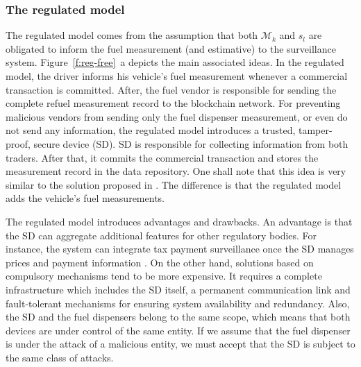 \documentclass[sigplan]{acmart}
\begin{document}
\subsubsection{The regulated model}
The regulated model comes from the assumption that both $\mathcal{M}_k$ and $s_l$ are obligated to inform the fuel measurement (and estimative) to the surveillance system.
Figure~\ref{f:reg-free}~a depicts the main associated ideas.
In the regulated model, the driver informs his vehicle's fuel measurement whenever a commercial transaction is committed.
After, the fuel vendor is responsible for sending the complete refuel measurement record to the blockchain network.
For preventing malicious vendors from sending only the fuel dispenser measurement, or even do not send any information, the regulated model introduces a trusted, tamper-proof, secure device (SD).
SD is responsible for collecting information from both traders.
After that, it commits the commercial transaction and stores the measurement record in the data repository.
One shall note that this idea is very similar to the solution proposed in \cite{Beteto2016}. 
The difference is that the regulated model adds the vehicle's fuel measurements.

The regulated model introduces advantages and drawbacks.
An advantage is that the SD can aggregate additional features for other regulatory bodies. 
For instance, the system can integrate tax payment surveillance once the SD manages prices and payment information \cite{Beteto2016}. 
On the other hand, solutions based on compulsory mechanisms tend to be more expensive.
It requires a complete infrastructure which includes the SD itself, a permanent communication link and fault-tolerant mechanisms for ensuring system availability and redundancy.
Also, the SD and the fuel dispensers belong to the same scope, which means that both devices are under control of the same entity.
If we assume that the fuel dispenser is under the attack of a malicious entity, we must accept that the SD is subject to the same class of attacks.
\end{document}
